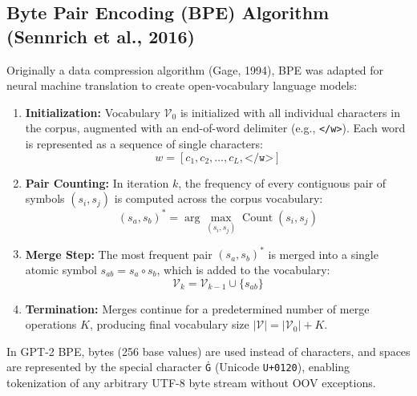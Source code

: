 \subsection{Byte Pair Encoding (BPE) Algorithm (Sennrich et al., 2016)}
Originally a data compression algorithm (Gage, 1994), BPE was adapted for neural machine translation to create open-vocabulary language models:
\begin{enumerate}
    \item \textbf{Initialization:} Vocabulary $\mathcal{V}_0$ is initialized with all individual characters in the corpus, augmented with an end-of-word delimiter (e.g., \texttt{</w>}). Each word is represented as a sequence of single characters:
    \begin{equation}
        w = [c_1, c_2, \dots, c_L, \texttt{</w>}]
    \end{equation}
    \item \textbf{Pair Counting:} In iteration $k$, the frequency of every contiguous pair of symbols $(s_i, s_j)$ is computed across the corpus vocabulary:
    \begin{equation}
        (s_a, s_b)^* = \arg\max_{(s_i, s_j)} \operatorname{Count}(s_i, s_j)
    \end{equation}
    \item \textbf{Merge Step:} The most frequent pair $(s_a, s_b)^*$ is merged into a single atomic symbol $s_{ab} = s_a \circ s_b$, which is added to the vocabulary:
    \begin{equation}
        \mathcal{V}_{k} = \mathcal{V}_{k-1} \cup \{s_{ab}\}
    \end{equation}
    \item \textbf{Termination:} Merges continue for a predetermined number of merge operations $K$, producing final vocabulary size $|\mathcal{V}| = |\mathcal{V}_0| + K$.
\end{enumerate}
In GPT-2 BPE, bytes (256 base values) are used instead of characters, and spaces are represented by the special character \texttt{Ġ} (Unicode \texttt{U+0120}), enabling tokenization of any arbitrary UTF-8 byte stream without OOV exceptions.

